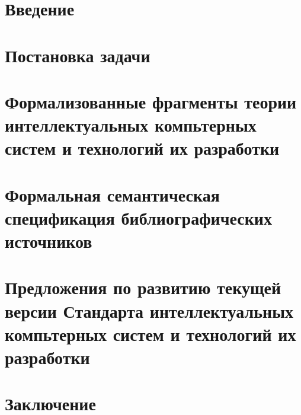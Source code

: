 \section*{Введение}


\newpage
\section{Постановка задачи}


\newpage
\section{Формализованные фрагменты теории интеллектуальных компьтерных систем и технологий их разработки}


\newpage
\section{Формальная семантическая спецификация библиографических источников}


\newpage
\section{Предложения по развитию текущей версии Стандарта интеллектуальных компьтерных систем и технологий их разработки}


\newpage
\section*{Заключение}

